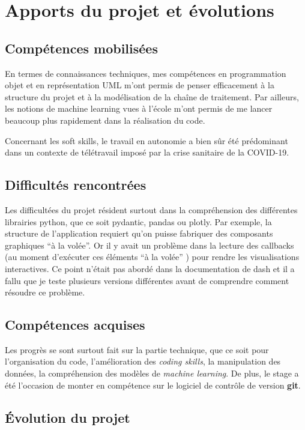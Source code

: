 \chapter{Apports du projet et évolutions}

\section{Compétences mobilisées}

En termes de connaissances techniques, mes compétences en programmation objet et en représentation UML m’ont permis de penser efficacement à la structure du projet et à la modélisation de la chaîne de traitement. Par ailleurs, les notions de machine learning vues à l’école m’ont permis de me lancer beaucoup plus rapidement dans la réalisation du code.

Concernant les soft skills, le travail en autonomie a bien sûr été prédominant dans un contexte de télétravail imposé par la crise sanitaire de la COVID-19.

\section{Difficultés rencontrées}

Les difficultées du projet résident surtout dans la compréhension des différentes librairies python, que ce soit pydantic, pandas ou plotly. Par exemple, la structure de l’application requiert qu’on puisse fabriquer des composants graphiques “à la volée”. Or il y avait un problème dans la lecture des callbacks (au moment d’exécuter ces éléments “à la volée” ) pour rendre les visualisations interactives. Ce point n’était pas abordé dans la documentation de dash et il a fallu que je teste plusieurs versions différentes avant de comprendre comment résoudre ce problème.

\section{Compétences acquises}

Les progrès se sont surtout fait sur la partie technique, que ce soit pour l'organisation du code, l'amélioration des \textit{coding skills}, la manipulation des données, la compréhension des modèles de \textit{machine learning}. De plus, le stage a été l'occasion de monter en compétence sur le logiciel de contrôle de version \textbf{git}.

\section{Évolution du projet}

